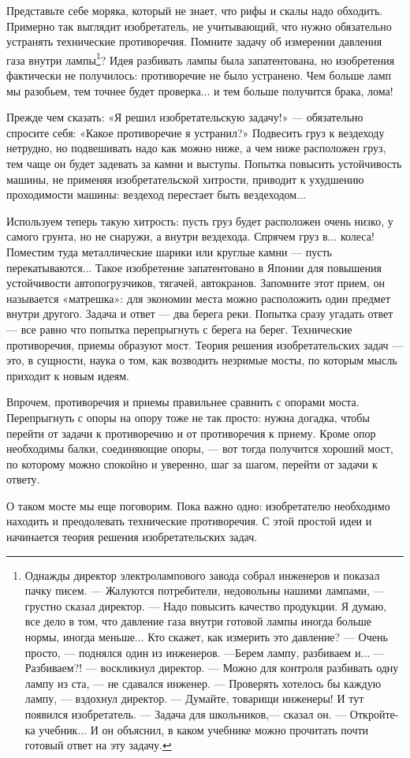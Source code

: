\documentclass[11pt,a4paper]{article}
\begin{document}
Представьте себе моряка, который не знает, что рифы и скалы надо обходить.
Примерно так выглядит изобретатель, не учитывающий, что нужно обязательно
устранять технические противоречия. Помните задачу об измерении давления газа
внутри лампы\footnote{Однажды директор электролампового завода собрал
  инженеров и показал пачку писем.  — Жалуются потребители, недовольны нашими
  лампами, — грустно сказал директор. — Надо повысить качество продукции.  Я
  думаю, все дело в том, что давление газа внутри готовой лампы иногда больше
  нормы, иногда меньше... Кто скажет, как измерить это давление?  — Очень
  просто, — поднялся один из инженеров. —Берем лампу, разбиваем и...  —
  Разбиваем?! — воскликнул директор.  — Можно для контроля разбивать одну
  лампу из ста, — не сдавался инженер.  — Проверять хотелось бы каждую лампу,
  — вздохнул директор. — Думайте, товарищи инженеры!  И тут появился
  изобретатель.  — Задача для школьников,— сказал он. — Откройте-ка
  учебник...  И он объяснил, в каком учебнике можно прочитать почти готовый
  ответ на эту задачу.}?  Идея разбивать лампы была запатентована, но
изобретения фактически не получилось: противоречие не было устранено. Чем
больше ламп мы разобьем, тем точнее будет проверка...  и тем больше получится
брака, лома!

Прежде чем сказать: «Я решил изобретательскую задачу!» — обязательно спросите
себя: «Какое противоречие я устранил?» Подвесить груз к вездеходу нетрудно, но
подвешивать надо как можно ниже, а чем ниже расположен груз, тем чаще он будет
задевать за камни и выступы. Попытка повысить устойчивость машины, не применяя
изобретательской хитрости, приводит к ухудшению проходимости машины: вездеход
перестает быть вездеходом...

Используем теперь такую хитрость: пусть груз будет расположен очень низко, у
самого грунта, но не снаружи, а внутри вездехода. Спрячем груз в...  колеса!
Поместим туда металлические шарики или круглые камни — пусть перекатываются...
Такое изобретение запатентовано в Японии для повышения устойчивости
автопогрузчиков, тягачей, автокранов. Запомните этот прием, он называется
«матрешка»: для экономии места можно расположить один предмет внутри другого.
Задача и ответ — два берега реки.  Попытка сразу угадать ответ — все равно что
попытка перепрыгнуть с берега на берег. Технические противоречия, приемы
образуют мост. Теория решения изобретательских задач — это, в сущности, наука
о том, как возводить незримые мосты, по которым мысль приходит к новым идеям.

Впрочем, противоречия и приемы правильнее сравнить с опорами моста.
Перепрыгнуть с опоры на опору тоже не так просто: нужна догадка, чтобы перейти
от задачи к противоречию и от противоречия к приему. Кроме опор необходимы
балки, соединяющие опоры, — вот тогда получится хороший мост, по которому
можно спокойно и уверенно, шаг за шагом, перейти от задачи к ответу.

О таком мосте мы еще поговорим.  Пока важно одно: изобретателю необходимо
находить и преодолевать технические противоречия. С этой простой идеи и
начинается теория решения изобретательских задач.
\end{document}
